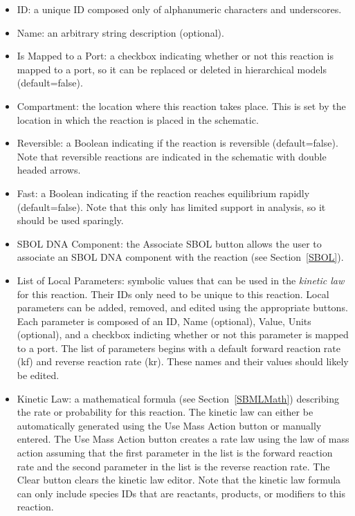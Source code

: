 \documentclass[titlepage,11pt]{article}
\begin{document}
\begin{itemize}
\item ID: a unique ID composed only of alphanumeric characters and underscores.
\item Name: an arbitrary string description (optional).
\item Is Mapped to a Port: a checkbox indicating whether or not this reaction is mapped to a port, so it can be replaced or deleted in hierarchical models (default=false).
\item Compartment: the location where this reaction takes place.  This is set by the location in which the reaction is placed in the schematic.
\item Reversible: a Boolean indicating if the reaction is reversible (default=false).  Note that reversible reactions are indicated in the schematic with double headed arrows.
\item Fast: a Boolean indicating if the reaction reaches equilibrium rapidly (default=false).  Note that this only has limited support in analysis, so it should be used sparingly.
\item SBOL DNA Component: the Associate SBOL button allows the user to associate an SBOL DNA component with the reaction (see Section~\ref{SBOL}).
\item List of Local Parameters: symbolic values that can be used in the \emph{kinetic law} for this reaction.  Their IDs only need to be unique to this reaction.  Local parameters can be added, removed, and edited using the appropriate buttons.  Each parameter is composed of an ID, Name (optional), Value, Units (optional), and a checkbox indicting whether or not this parameter is mapped to a port.  The list of parameters begins with a default forward reaction rate (kf) and reverse reaction rate (kr).  These names and their values should likely be edited. 
\item Kinetic Law: a mathematical formula (see Section~\ref{SBMLMath}) describing the rate or probability for this reaction.  The kinetic law can either be automatically generated using the Use Mass Action button or manually entered.  The Use Mass Action button creates a rate law using the law of mass action assuming that the first parameter in the list is the forward reaction rate and the second parameter in the list is the reverse reaction rate.  
The Clear button clears the kinetic law editor.  Note that the kinetic law formula can only include species IDs that are reactants, products, or modifiers to this reaction.
\end{itemize}
\end{document}
